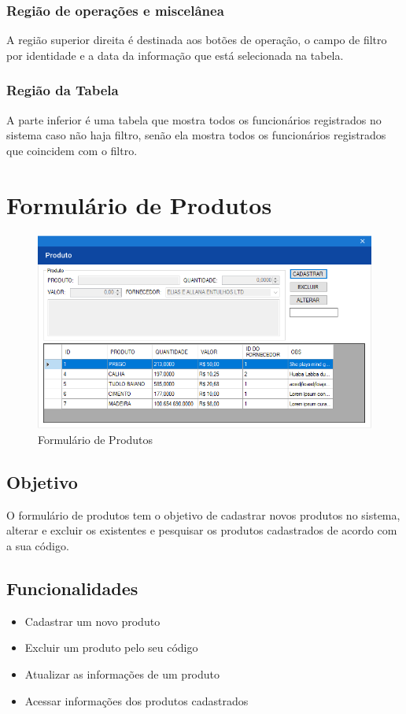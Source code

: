 \documentclass[
	article,			%
	12pt,				%
	oneside,			%
	a4paper,			%
	english,			%
	brazil,				%
	sumario=tradicional
	]{abntex2}
\begin{document}
			\subsubsection{Região de operações e miscelânea}
			A região superior direita é destinada aos botões de operação, o campo de filtro por identidade e a data da informação que está selecionada na tabela.
			\subsubsection{Região da Tabela}
			A parte inferior é uma tabela que mostra todos os funcionários registrados no sistema caso não haja filtro, senão ela mostra todos os funcionários registrados que coincidem com o filtro.
	\newpage
	\section{Formulário de Produtos}
		\begin{figure}[!htb]
			\centering
			\includegraphics[scale=0.7]{./Figuras/FrmProduto.png}
			\caption{Formulário de Produtos}
		\end{figure}
		\subsection{Objetivo}
		O formulário de produtos tem o objetivo de cadastrar novos produtos no sistema, alterar e excluir os existentes e pesquisar os produtos cadastrados de acordo com a sua código.
		\subsection{Funcionalidades}
			\begin{itemize}
				\item Cadastrar um novo produto
				\item Excluir um produto pelo seu código
				\item Atualizar as informações de um produto
				\item Acessar informações dos produtos cadastrados
			\end{itemize}
\end{document}
